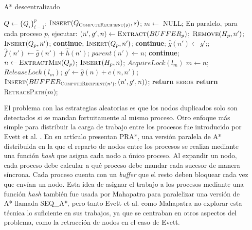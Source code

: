 \documentclass[a4paper,12pt]{article}
\begin{document}


\begin{algorithm}[H]
\caption{A* descentralizado}\label{decentralized-astar}
\begin{algorithmic}[1]
\State $Q \gets \{Q_i\}_{i=1}^p$;
\State $\textsc{Insert}(Q_{\textsc{ComputeRecipient}(s)}, s)$;
\State $m \gets$ NULL;
\State En paralelo, para cada proceso $p$, ejecutar:
        \State $(n', g', n) \gets \textsc{Extract}(BUFFER_p)$;
                \State $\textsc{Remove}(H_p, n')$;
                \State $\textsc{Insert}(Q_p, n')$;
            \Else
                \State \textbf{continue};
            \EndIf
        \Else
                \State $\textsc{Insert}(Q_p, n')$;
                \State \textbf{continue};
            \EndIf
        \EndIf
        \State $\hat{g}(n') \gets g'$;;
        \State $\hat{f}(n') \gets \hat{g}(n') + \hat{h}(n')$;
        \State $parent(n') \gets n$;
    \EndWhile
        \State \textbf{continue};
    \EndIf
    \State $n \gets \textsc{ExtractMin}(Q_p)$;
    \State $\textsc{Insert}(H_p, n)$;
        \State $AcquireLock(l_m)$
            \State $m \gets n$;
        \EndIf
        \State $ReleaseLock(l_m)$;
    \EndIf
        \State $g' \gets \hat{g}(n) + c(n, n')$;
        \State $\textsc{Insert}(BUFFER_{\textsc{ComputeRecipient}(n')}, (n', g', n))$;
    \EndFor
\EndWhile
{}
    \State \textbf{return} \textsc{error}
\Else
    \State \textbf{return} \textsc{RetracePath}($m$);
\EndIf
\end{algorithmic}
\end{algorithm}

El problema con las estrategias aleatorias es que los nodos duplicados solo son detectados si se mandan fortuitamente al mismo proceso. Otro enfoque más simple para distribuir la carga de trabajo entre los procesos fue introducido por Evett et al. \cite{evett1995massively}. En su artículo presentan PRA*, una versión paralela de A* distribuida en la que el reparto de nodos entre los procesos se realiza mediante una función \textit{hash} que asigna cada nodo a único proceso. Al expandir un nodo, cada proceso debe calcular a qué proceso debe mandar cada sucesor de manera síncrona. Cada proceso cuenta con un \textit{buffer} que el resto deben bloquear cada vez que envían un nodo. Esta idea de asignar el trabajo a los procesos mediante una función \textit{hash} también fue usada por Mahapatra \cite{mahapatra2002scalable} para paralelizar una versión de A* llamada SEQ\_A*, pero tanto Evett et al. como Mahapatra no explorar esta técnica lo suficiente en sus trabajos, ya que se centraban en otros aspectos del problema, como la retracción de nodos en el caso de Evett.
\end{document}
